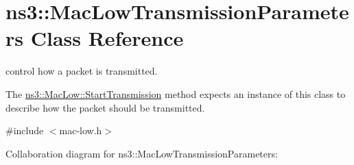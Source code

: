 \hypertarget{classns3_1_1MacLowTransmissionParameters}{}\section{ns3\+:\+:Mac\+Low\+Transmission\+Parameters Class Reference}
\label{classns3_1_1MacLowTransmissionParameters}


control how a packet is transmitted.

The \hyperlink{classns3_1_1MacLow_a3d13643c758e213041f8389c1041074b}{ns3\+::\+Mac\+Low\+::\+Start\+Transmission} method expects an instance of this class to describe how the packet should be transmitted.  




{\ttfamily \#include $<$mac-\/low.\+h$>$}



Collaboration diagram for ns3\+:\+:Mac\+Low\+Transmission\+Parameters\+:
